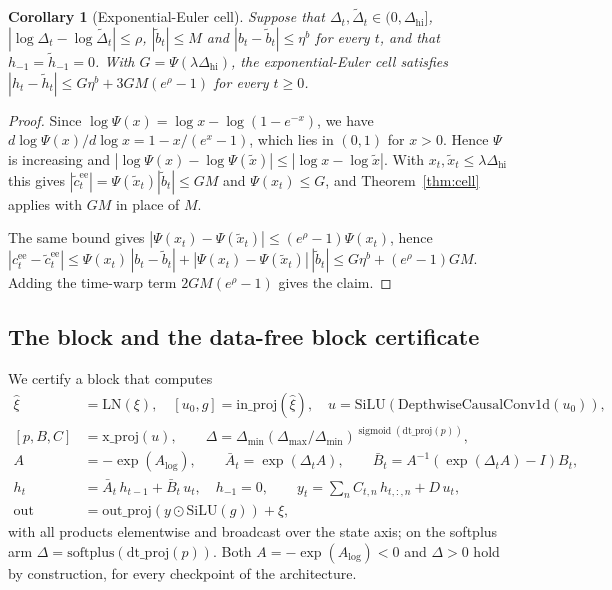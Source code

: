 \documentclass[11pt, a4paper]{article}
\newtheorem{corollary}[proposition]{Corollary}
\theoremstyle{remark}
\theoremstyle{plain}
\newcommand{\Abar}{\bar{A}}
\newcommand{\Bbar}{\bar{B}}
\begin{document}
\begin{corollary}[Exponential-Euler cell]
\label{cor:euler}
Suppose that $\Delta_t, \tilde\Delta_t \in (0, \Delta_{\mathrm{hi}}]$,
$|\log\Delta_t - \log\tilde\Delta_t| \le \rho$, $|\tilde b_t| \le M$ and
$|b_t - \tilde b_t| \le \eta^{b}$ for every $t$, and that
$h_{-1} = \tilde h_{-1} = 0$. With $G = \Psi(\lambda\Delta_{\mathrm{hi}})$, the
exponential-Euler cell satisfies $|h_t - \tilde h_t| \le G\eta^{b} + 3GM(e^{\rho} - 1)$ for every
$t \ge 0$.
\end{corollary}

\begin{proof}
Since $\log\Psi(x) = \log x - \log(1 - e^{-x})$, we have $d\log\Psi(x)/d\log x =
1 - x/(e^{x} - 1)$, which lies in $(0, 1)$ for $x > 0$. Hence $\Psi$ is increasing and
$|\log\Psi(x) - \log\Psi(\tilde x)| \le |\log x - \log\tilde x|$. With
$x_t, \tilde x_t \le \lambda\Delta_{\mathrm{hi}}$ this gives
$|\tilde c^{\mathrm{ee}}_t| = \Psi(\tilde x_t)|\tilde b_t| \le GM$ and $\Psi(x_t) \le G$, and
Theorem~\ref{thm:cell} applies with $GM$ in place of $M$.

The same bound gives $|\Psi(x_t) - \Psi(\tilde x_t)| \le (e^{\rho} - 1)\Psi(x_t)$, hence
$|c^{\mathrm{ee}}_t - \tilde c^{\mathrm{ee}}_t| \le \Psi(x_t)\,|b_t - \tilde b_t|
+ |\Psi(x_t) - \Psi(\tilde x_t)|\,|\tilde b_t| \le G\eta^{b} + (e^{\rho} - 1)GM$. Adding the
time-warp term $2GM(e^{\rho} - 1)$ gives the claim.
\end{proof}

\subsection{The block and the data-free block certificate}
\label{app:block}

We certify a block that computes
\begin{align*}
  \hat\xi       &= \mathrm{LN}(\xi),
  \quad [u_0, g] = \mathrm{in\_proj}(\hat\xi),
  \quad u = \mathrm{SiLU}\!\left( \mathrm{DepthwiseCausalConv1d}(u_0) \right), \\
  [p, B, C]     &= \mathrm{x\_proj}(u),
  \qquad \Delta = \Delta_{\min}\left( \Delta_{\max} / \Delta_{\min} \right)^{\operatorname{sigmoid}(\mathrm{dt\_proj}(p))}, \\
  A             &= -\exp(A_{\log}),
  \qquad
  \Abar_t = \exp(\Delta_t A),
  \qquad
  \Bbar_t = A^{-1}\!\left( \exp(\Delta_t A) - I \right) B_t, \\
  h_t           &= \Abar_t\, h_{t-1} + \Bbar_t\, u_t, \quad h_{-1} = 0,
  \qquad
  y_t = \textstyle\sum_n C_{t,n}\, h_{t,:,n} + D\, u_t, \\
  \mathrm{out}  &= \mathrm{out\_proj}\!\left( y \odot \mathrm{SiLU}(g) \right) + \xi,
\end{align*}
with all products elementwise and broadcast over the state axis; on the softplus arm
$\Delta = \mathrm{softplus}(\mathrm{dt\_proj}(p))$. Both $A = -\exp(A_{\log}) < 0$ and
$\Delta > 0$ hold by construction, for every checkpoint of the architecture.
\end{document}
